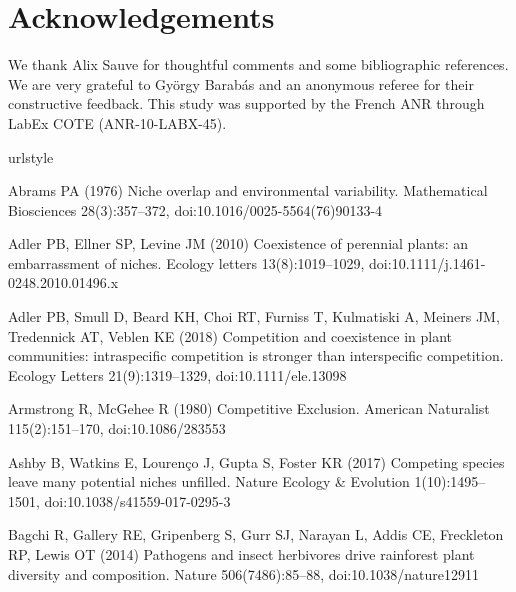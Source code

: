 \documentclass[a4paper,12pt]{article}
\begin{document}
\section*{Acknowledgements}

We thank Alix Sauve for thoughtful comments and some bibliographic
references. We are very grateful to Gy\"orgy Barab\'as and an anonymous
referee for their constructive feedback. This study was supported
by the French ANR through LabEx COTE (ANR-10-LABX-45).

\begin{thebibliography}{68}
\providecommand{\natexlab}[1]{#1}
\providecommand{\url}[1]{{#1}}
\providecommand{\urlprefix}{URL }
\expandafter\ifx\csname urlstyle\endcsname\relax
  \providecommand{\doi}[1]{DOI~\discretionary{}{}{}#1}\else
  \providecommand{\doi}{DOI~\discretionary{}{}{}\begingroup
  \urlstyle{rm}\Url}\fi
\providecommand{\eprint}[2][]{\url{#2}}

Abrams PA (1976) Niche overlap and environmental variability. Mathematical
  Biosciences 28(3):357--372, doi:{10.1016/0025-5564(76)90133-4}

Adler PB, Ellner SP, Levine JM (2010) Coexistence of perennial plants: an
  embarrassment of niches. Ecology letters 13(8):1019--1029,
  doi:{10.1111/j.1461-0248.2010.01496.x}

Adler PB, Smull D, Beard KH, Choi RT, Furniss T, Kulmatiski A, Meiners JM,
  Tredennick AT, Veblen KE (2018) Competition and coexistence in plant
  communities: intraspecific competition is stronger than interspecific
  competition. Ecology Letters 21(9):1319--1329, doi:{10.1111/ele.13098}

Armstrong R, McGehee R (1980) Competitive {Exclusion}. American Naturalist
  115(2):151--170, doi:{10.1086/283553}

Ashby B, Watkins E, Louren\c{c}o J, Gupta S, Foster KR (2017) Competing species
  leave many potential niches unfilled. Nature Ecology \& Evolution
  1(10):1495--1501, doi:{10.1038/s41559-017-0295-3}

Bagchi R, Gallery RE, Gripenberg S, Gurr SJ, Narayan L, Addis CE, Freckleton
  RP, Lewis OT (2014) Pathogens and insect herbivores drive rainforest plant
  diversity and composition. Nature 506(7486):85--88, doi:{10.1038/nature12911}


\end{thebibliography}
\end{document}
